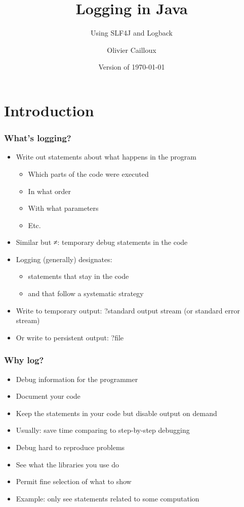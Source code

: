 \documentclass[french, english]{beamer}
\title{Logging in Java}
\subtitle{Using SLF4J and Logback}
\author{Olivier Cailloux}
\institute[LAMSADE]{LAMSADE, Université Paris-Dauphine}
\date{Version of \today}
\begin{document}


\begin{frame}[plain]
   \titlepage
\end{frame}
\addtocounter{framenumber}{-1}

\section{Introduction}
\begin{frame}
	\frametitle{What’s logging?}
	\begin{itemize}
		\item Write out statements about what happens in the program
		\begin{itemize}
			\item Which parts of the code were executed
			\item In what order
			\item With what parameters
			\item Etc.
		\end{itemize}
		\item Similar but ≠: temporary debug statements in the code
		\item Logging (generally) designates: 
		\begin{itemize}
			\item statements that stay in the code
			\item and that follow a systematic strategy
		\end{itemize}
		\item Write to temporary output: ?\pause standard output stream (or standard error stream)
		\item Or write to persistent output: ?\pause file
	\end{itemize}
\end{frame}

\begin{frame}
	\frametitle{Why log?}
	\begin{itemize}	
		\item Debug information for the programmer
		\item Document your code
		\item Keep the statements in your code but disable output on demand
		\item Usually: save time comparing to step-by-step debugging
		\item Debug hard to reproduce problems
		\item See what the libraries you use do
		\item Permit fine selection of what to show
		\item Example: only see statements related to some computation
	\end{itemize}
\end{frame}
\end{document}
